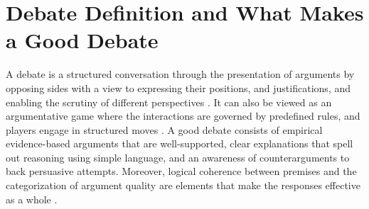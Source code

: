 \documentclass[conference]{IEEEtran}
\begin{document}
\section{Debate Definition and What Makes a Good Debate}
A debate is a structured conversation through the presentation of arguments by opposing sides with a view to expressing their positions, and justifications, and enabling the scrutiny of different perspectives \cite{b1}\cite{b2}. It can also be viewed as an argumentative game where the interactions are governed by predefined rules, and players engage in structured moves \cite{b6}. A good debate consists of empirical evidence-based arguments that are well-supported, clear explanations that spell out reasoning using simple language, and an awareness of counterarguments to back persuasive attempts. Moreover, logical coherence between premises and the categorization of argument quality are elements that make the responses effective as a whole \cite{b6}.
\end{document}
